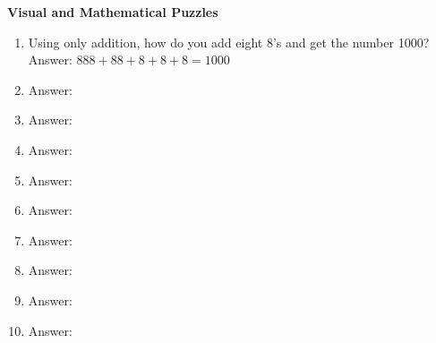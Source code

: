 \documentclass[11pt]{article}
\begin{document}
\textbf{Visual and Mathematical  Puzzles}
{\begin{enumerate}[label = \arabic*. ]
\item Using only addition, how do you add eight 8's and get the number 1000? \hfill Answer: $888 + 88 + 8 + 8 + 8 = 1000$
\item \hfill Answer: 
\item \hfill Answer: 
\item \hfill Answer: 
\item \hfill Answer: 
\item \hfill Answer: 
\item \hfill Answer: 
\item \hfill Answer: 
\item \hfill Answer: 
\item \hfill Answer: 
\end{enumerate}}





     
\end{document}
